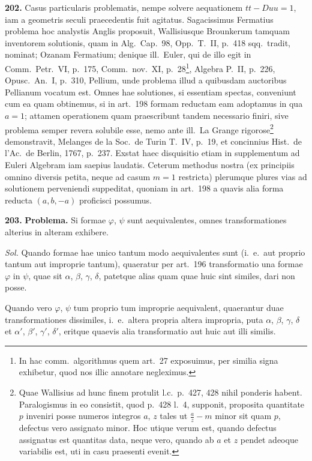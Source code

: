 \documentclass[12pt,a4paper]{article}
\theoremstyle{plain}
\theoremstyle{definition}
\theoremstyle{remark}
\begin{document}
\textbf{202.}
Casus particularis problematis, nempe solvere aequationem $tt-Duu=1$, iam a geometris seculi praecedentis fuit agitatus. Sagacissimus Fermatius problema hoc analystis Anglis proposuit, Wallisiusque Brounkerum tamquam inventorem solutionis, quam in Alg.\ Cap.\ 98, Opp.\ T.\ II, p.\ 418 sqq.\ tradit, nominat; Ozanam Fermatium; denique ill.\ Euler, qui de illo egit in Comm.\ Petr.\ VI, p.\ 175, Comm.\ nov.\ XI, p.\ 28\footnote{In hac comm.\ algorithmus quem art.\ 27 exposuimus, per similia signa exhibetur, quod nos illic annotare negleximus.}, Algebra P.\ II, p.\ 226, Opusc.\ An.\ I, p.\ 310, Pellium, unde problema illud a quibusdam auctoribus Pellianum vocatum est. Omnes hae solutiones, si essentiam spectas, conveniunt cum ea quam obtinemus, si in art.\ 198 formam reductam eam adoptamus in qua $a=1$; attamen operationem quam praescribunt tandem necessario finiri, sive problema semper revera solubile esse, nemo ante ill.\ La Grange rigorose\footnote{Quae Wallisius ad hunc finem protulit l.c.\ p.\ 427, 428 nihil ponderis habent. Paralogismus in eo consistit, quod p.\ 428 l.\ 4, supponit, proposita quantitate $p$ inveniri posse numeros integros $a$, $z$ tales ut $\frac{a}{z}-m$ minor sit quam $p$, defectus vero assignato minor. Hoc utique verum est, quando defectus assignatus est quantitas data, neque vero, quando ab $a$ et $z$ pendet adeoque variabilis est, uti in casu praesenti evenit.} demonstravit, Melanges de la Soc.\ de Turin T.\ IV, p.\ 19, et concinnius Hist.\ de l'Ac.\ de Berlin, 1767, p.\ 237. Exstat haec disquisitio etiam in supplementum ad Euleri Algebram iam saepius laudatis. Ceterum methodus nostra (ex principiis omnino diversis petita, neque ad casum $m=1$ restricta) plerumque plures vias ad solutionem perveniendi suppeditat, quoniam in art.\ 198 a quavis alia forma reducta $(a,b,-a)$ proficisci possumus.


\textbf{203.}
\textbf{Problema.}
Si formae $\varphi$, $\psi$ sunt aequivalentes, omnes transformationes alterius in alteram exhibere.

\textit{Sol.}
Quando formae hae unico tantum modo aequivalentes sunt (i.\ e.\ aut proprio tantum aut improprie tantum), quaeratur per art.\ 196 transformatio una formae $\varphi$ in $\psi$, quae sit $\alpha$, $\beta$, $\gamma$, $\delta$, patetque alias quam quae huic sint similes, dari non posse.

Quando vero $\varphi$, $\psi$ tum proprio tum improprie aequivalent, quaerantur duae transformationes dissimiles, i.\ e.\ altera propria altera impropria, puta $\alpha$, $\beta$, $\gamma$, $\delta$ et $\alpha'$, $\beta'$, $\gamma'$, $\delta'$, eritque quaevis alia transformatio aut huic aut illi similis.
\end{document}
